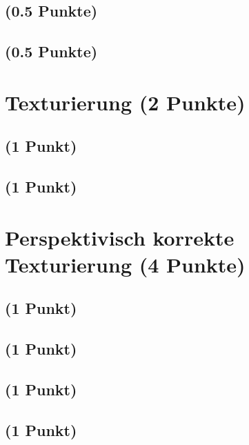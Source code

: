 \documentclass[a4paper,10pt,DIV=14]{article}
\begin{document}
\subsection{(0.5 Punkte)} %
\subsection{(0.5 Punkte)}

\section{Texturierung (2 Punkte)}

\subsection{(1 Punkt)}

\subsection{(1 Punkt)} 

\section{Perspektivisch korrekte Texturierung (4 Punkte)}

\subsection{(1 Punkt)}

\subsection{(1 Punkt)} 

\subsection{(1 Punkt)}

\subsection{(1 Punkt)}
\end{document}
